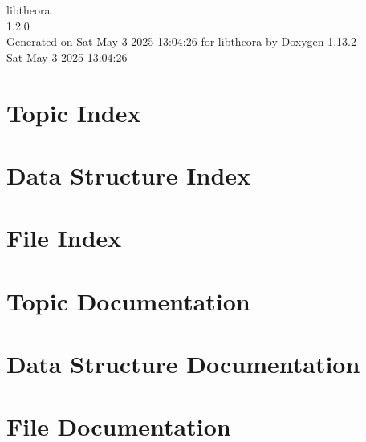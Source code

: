 \documentclass[twoside]{book}
\newcommand{\+}{\discretionary{\mbox{\scriptsize$\hookleftarrow$}}{}{}}
\newcommand{\clearemptydoublepage}{%
    \newpage{\pagestyle{empty}\cleardoublepage}%
  }
\begin{document}
  \raggedbottom
  \begin{titlepage}
  \vspace*{7cm}
  \begin{center}%
  {\Large libtheora}\\
  [1ex]\large 1.\+2.\+0 \\
  \vspace*{1cm}
  {\large Generated on Sat May 3 2025 13\+:04\+:26 for libtheora by Doxygen 1.13.2}\\
    \vspace*{0.5cm}
    {\small Sat May 3 2025 13:04:26}
  \end{center}
  \end{titlepage}
  \clearemptydoublepage
  \tableofcontents
  \clearemptydoublepage

\chapter{Topic Index}

\chapter{Data Structure Index}

\chapter{File Index}

\chapter{Topic Documentation}




\chapter{Data Structure Documentation}











\chapter{File Documentation}








  \backmatter
  \newpage
  \clearemptydoublepage
  \printindex
\end{document}
